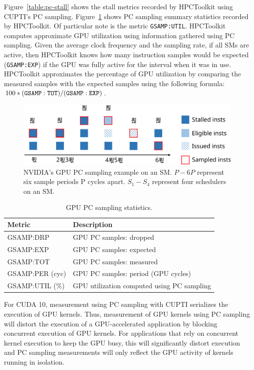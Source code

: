 Figure~\ref{table:pc-stall} shows the stall metrics recorded by HPCToolkit using CUPTI's PC sampling. Figure~\ref{table:gsamp} shows PC sampling summary statistics recorded by HPCToolkit. Of particular note is the metric \verb|GSAMP:UTIL|. HPCToolkit computes approximate GPU utilization using information gathered using PC sampling. Given the average clock frequency and the sampling rate, if all SMs are active, then HPCToolkit knows how many instruction samples would be expected ({\tt GSAMP:EXP}) if the GPU was fully active for the interval when it was in use. HPCToolkit approximates the percentage of GPU utilization by comparing the measured samples with the expected samples using the following formula: $100 * {\tt (GSAMP:TOT)/ (GSAMP:EXP)}$.


\begin{figure}[t]
\includegraphics[width=\textwidth]{fig/mental-model.svg}
\caption{NVIDIA's GPU PC sampling example on an SM. $P-6P$ represent
six sample periods P cycles apart. $S_{1}-S_{4}$ represent four schedulers on an SM.}
\label{fig:pc sampling}
\vspace{-2ex}
\end{figure}

\begin{table}[t]
\centering
\begin{tabular}{|l|l|}\hline
Metric & Description\\\hline\hline
 GSAMP:DRP  &  GPU PC samples: dropped  \\\hline
  GSAMP:EXP  &  GPU PC samples: expected  \\\hline
  GSAMP:TOT  &  GPU PC samples: measured  \\\hline
  GSAMP:PER (cyc)  &  GPU PC samples: period (GPU cycles)  \\\hline
  GSAMP:UTIL (\%) & GPU utilization computed using PC sampling\\\hline
\end{tabular}
\caption{GPU PC sampling statistics.}
\label{table:gsamp}
\end{table}



For CUDA 10, measurement using PC sampling with CUPTI serializes the execution of GPU kernels. Thus, measurement of GPU kernels using PC sampling will distort the execution of a GPU-accelerated application by blocking concurrent execution of GPU kernels. For applications that rely on concurrent kernel execution to keep the GPU busy, this will significantly distort execution and PC sampling measurements will only reflect the GPU activity of kernels running in isolation.




